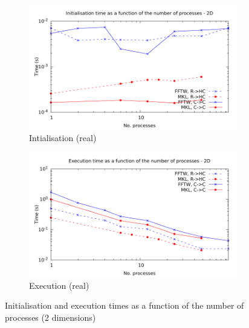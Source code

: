 \documentclass[12pt, a4paper]{article}
\begin{document}
\begin{figure}[H]
\captionsetup{width=0.8\linewidth}
\centering
\begin{subfigure}{.5\textwidth}
\centering
\includegraphics[width=.9\linewidth]{graphs/mpi-init-2d.pdf}
\caption{Intialisation (real)}
\label{2DMPII}
\end{subfigure}%
\begin{subfigure}{.5\textwidth}
\centering
\includegraphics[width=.9\linewidth]{graphs/mpi-exec-2d.pdf}
\caption{Execution (real)}
\label{2DMPIE}
\end{subfigure}
\caption{Initialisation and execution times as a function of the number of processes (2 dimensions)}
\label{2DMPI}
\end{figure}
\end{document}
